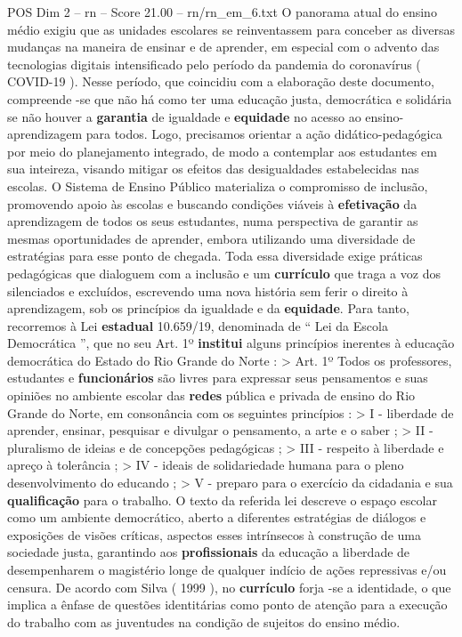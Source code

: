 \begin{textsample}{POS Dim 2 – rn – Score 21.00 – rn/rn\_em\_6.txt}
O panorama atual do ensino médio exigiu que as unidades escolares se reinventassem para conceber as diversas mudanças na maneira de ensinar e de aprender, em especial com o advento das tecnologias digitais intensificado pelo período da pandemia do coronavírus ( COVID-19 ).
Nesse período, que coincidiu com a elaboração deste documento, compreende -se que não há como ter uma educação justa, democrática e solidária se não houver a \textbf{garantia} de igualdade e \textbf{equidade} no acesso ao ensino-aprendizagem para todos.
Logo, precisamos orientar a ação didático-pedagógica por meio do planejamento integrado, de modo a contemplar aos estudantes em sua inteireza, visando mitigar os efeitos das desigualdades estabelecidas nas escolas.
O Sistema de Ensino Público materializa o compromisso de inclusão, promovendo apoio às escolas e buscando condições viáveis à \textbf{efetivação} da aprendizagem de todos os seus estudantes, numa perspectiva de garantir as mesmas oportunidades de aprender, embora utilizando uma diversidade de estratégias para esse ponto de chegada.
Toda essa diversidade exige práticas pedagógicas que dialoguem com a inclusão e um \textbf{currículo} que traga a voz dos silenciados e excluídos, escrevendo uma nova história sem ferir o direito à aprendizagem, sob os princípios da igualdade e da \textbf{equidade}.
Para tanto, recorremos à Lei \textbf{estadual} 10.659/19, denominada de “ Lei da Escola Democrática ”, que no seu Art. 1º \textbf{institui} alguns princípios inerentes à educação democrática do Estado do Rio Grande do Norte : > Art. 1º Todos os professores, estudantes e \textbf{funcionários} são livres para expressar seus pensamentos e suas opiniões no ambiente escolar das \textbf{redes} pública e privada de ensino do Rio Grande do Norte, em consonância com os seguintes princípios : > I - liberdade de aprender, ensinar, pesquisar e divulgar o pensamento, a arte e o saber ; > II - pluralismo de ideias e de concepções pedagógicas ; > III - respeito à liberdade e apreço à tolerância ; > IV - ideais de solidariedade humana para o pleno desenvolvimento do educando ; > V - preparo para o exercício da cidadania e sua \textbf{qualificação} para o trabalho.
O texto da referida lei descreve o espaço escolar como um ambiente democrático, aberto a diferentes estratégias de diálogos e exposições de visões críticas, aspectos esses intrínsecos à construção de uma sociedade justa, garantindo aos \textbf{profissionais} da educação a liberdade de desempenharem o magistério longe de qualquer indício de ações repressivas e/ou censura.
De acordo com Silva ( 1999 ), no \textbf{currículo} forja -se a identidade, o que implica a ênfase de questões identitárias como ponto de atenção para a execução do trabalho com as juventudes na condição de sujeitos do ensino médio.

\end{textsample}
